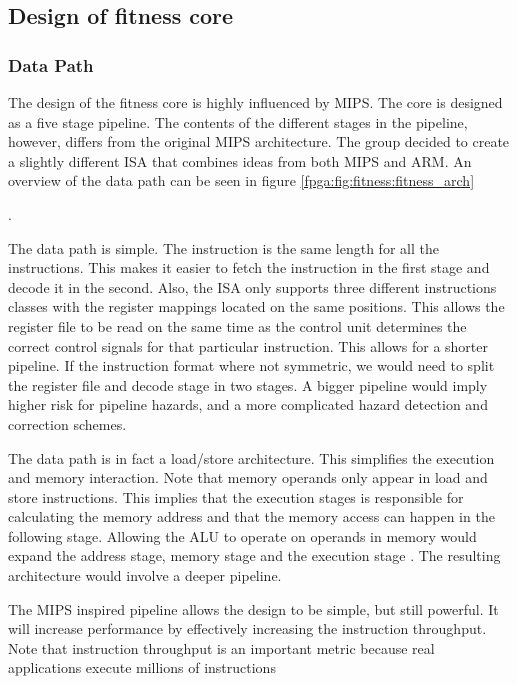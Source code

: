 \subsection{Design of fitness core} \label{fpga:fitness:ss:design_of_the_fitness_core}


\subsubsection{Data Path} \label{fpga:fitness:sss:data_path}
The design of the fitness core is highly influenced by MIPS. The core is designed as a five stage pipeline. The contents of the different stages in the pipeline, however, differs from the original MIPS architecture. The group decided to create a slightly different ISA that combines ideas from both MIPS and ARM. An overview of the data path can be seen in figure \ref{fpga:fig:fitness:fitness_arch}

.

The data path is  simple. The instruction is the same length for all the instructions. This makes it easier to fetch the instruction in the first stage and decode it in the second. Also, the ISA only supports three different instructions classes with the register mappings located on the same positions. This allows the register file to be read on the same time as the control unit determines the correct control signals for that particular instruction. This allows for a shorter pipeline. If the instruction format where not symmetric, we would need to split the register file and decode stage in two stages. A bigger pipeline would imply higher risk for pipeline hazards, and a more complicated hazard detection and correction schemes. 

The data path is in fact a load/store architecture. This simplifies the execution and memory interaction. Note that memory operands only appear in load and store instructions. This implies that the execution stages is responsible for calculating the memory address and that the memory access can happen in the following stage. Allowing the ALU to operate on operands in memory would expand the address stage, memory stage and the execution stage \cite[p.~335]{compOrgDes}. The resulting architecture would involve a deeper pipeline. 



The MIPS inspired pipeline allows the design to be simple, but still powerful. It  will increase performance by effectively increasing the instruction throughput. Note that instruction throughput is an important metric because real applications execute millions of instructions \cite[p.~335]{compOrgDes}



